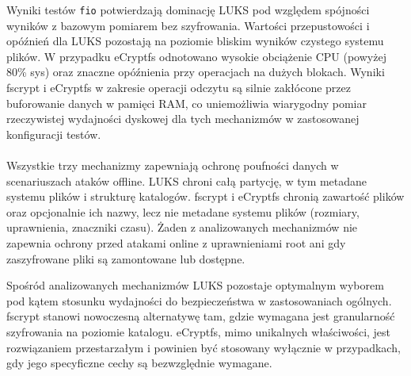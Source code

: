 \documentclass[a4paper]{article}
\begin{document}
Wyniki testów \texttt{fio} potwierdzają dominację LUKS pod względem spójności wyników
z bazowym pomiarem bez szyfrowania. Wartości przepustowości i opóźnień dla LUKS pozostają
na poziomie bliskim wyników czystego systemu plików. W przypadku eCryptfs odnotowano wysokie
obciążenie CPU (powyżej 80\% sys) oraz znaczne opóźnienia przy operacjach na dużych blokach.
Wyniki fscrypt i eCryptfs w zakresie operacji odczytu są silnie zakłócone przez buforowanie
danych w pamięci RAM, co uniemożliwia wiarygodny pomiar rzeczywistej wydajności dyskowej dla
tych mechanizmów w zastosowanej konfiguracji testów.
\\\\
Wszystkie trzy mechanizmy zapewniają ochronę poufności danych w scenariuszach ataków offline.
LUKS chroni całą partycję, w tym metadane systemu plików i strukturę katalogów. fscrypt
i eCryptfs chronią zawartość plików oraz opcjonalnie ich nazwy, lecz nie metadane systemu
plików (rozmiary, uprawnienia, znaczniki czasu). Żaden z analizowanych mechanizmów nie
zapewnia ochrony przed atakami online z uprawnieniami root ani  gdy zaszyfrowane pliki są
zamontowane lub dostępne.

Spośród analizowanych mechanizmów LUKS pozostaje optymalnym wyborem pod kątem stosunku
wydajności do bezpieczeństwa w zastosowaniach ogólnych. fscrypt stanowi nowoczesną
alternatywę tam, gdzie wymagana jest granularność szyfrowania na poziomie katalogu.
eCryptfs, mimo unikalnych właściwości, jest rozwiązaniem przestarzałym i powinien być
stosowany wyłącznie w przypadkach, gdy jego specyficzne cechy są bezwzględnie wymagane.
\end{document}
